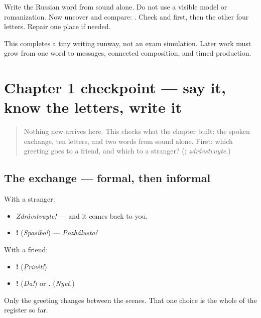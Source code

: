 Write the Russian word from sound alone. Do not use a visible model or romanization. Now uncover and compare: \textbf{}. Check \textbf{} and \textbf{} first, then the other four letters. Repair one place if needed.

\begin{tcolorbox}[breakable,colback=teal!4,colframe=teal!35!black,title={Before you move on}]
This completes a tiny writing runway, not an exam simulation. Later work must grow from one word to messages, connected composition, and timed production.
\end{tcolorbox}
\section[Practice]{Chapter 1 checkpoint — say it, know the letters, write it}

\label{lesson:RU-C01-checkpoint}



\begin{quote}
Nothing new arrives here. This checks what the chapter built: the spoken exchange, ten letters, and two words from sound alone. First: which greeting goes to a friend, and which to a stranger? (\textbf{}; \emph{zdrávstvuyte}.)
\end{quote}

\subsection*{The exchange — formal, then informal}
With a stranger:

\begin{itemize}
\raggedright
  \item \emph{Zdrávstvuyte!} — and it comes back to you.
  \item \textbf{!} (\emph{Spasíbo!}) — \emph{Pozhálusta!}
\end{itemize}

With a friend:

\begin{itemize}
\raggedright
  \item \textbf{!} (\emph{Privét!})
  \item \textbf{!} (\emph{Da!}) or \textbf{.} (\emph{Nyet.})
\end{itemize}

Only the greeting changes between the scenes. That one choice is the whole of the register so far.

